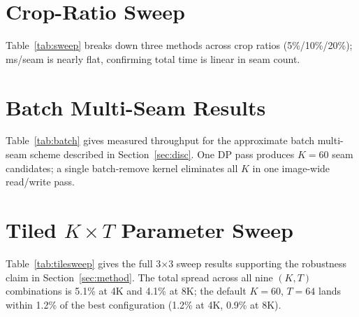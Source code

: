 \documentclass[conference]{IEEEtran}
\newcommand{\mainbodyendpage}{?}
\begin{document}
\xdef\mainbodyendpage{\thepage}

\appendices
\section{Crop-Ratio Sweep}
Table~\ref{tab:sweep} breaks down three methods across crop ratios
(5\%/10\%/20\%); ms/seam is nearly flat, confirming total time is linear in
seam count.



\section{Batch Multi-Seam Results}
\label{app:batch}
Table~\ref{tab:batch} gives measured throughput for the approximate batch
multi-seam scheme described in Section~\ref{sec:disc}.
One DP pass produces $K{=}60$ seam candidates; a single batch-remove
kernel eliminates all $K$ in one image-wide read/write pass.



\section{Tiled \texorpdfstring{$K{\times}T$}{K×T} Parameter Sweep}
\label{app:sweep}
Table~\ref{tab:tilesweep} gives the full 3$\times$3 sweep results
supporting the robustness claim in Section~\ref{sec:method}.
The total spread across all nine $(K,T)$ combinations is
5.1\% at 4K and 4.1\% at 8K; the default $K{=}60$, $T{=}64$ lands within
1.2\% of the best configuration (1.2\% at 4K, 0.9\% at 8K).


\end{document}
